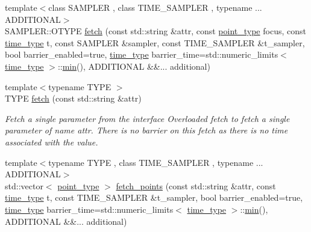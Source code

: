 \begin{DoxyCompactItemize}
{\footnotesize template$<$class S\+A\+M\+P\+L\+ER , class T\+I\+M\+E\+\_\+\+S\+A\+M\+P\+L\+ER , typename ... A\+D\+D\+I\+T\+I\+O\+N\+AL$>$ }\\S\+A\+M\+P\+L\+E\+R\+::\+O\+T\+Y\+PE \hyperlink{classmui_1_1uniface_acf7e84a01d20ef06dbcf4a1812456b24}{fetch} (const std\+::string \&attr, const \hyperlink{classmui_1_1uniface_abc356ab801269c69e38dc07179f85ef9}{point\+\_\+type} focus, const \hyperlink{classmui_1_1uniface_a65cbecf1936d7d61cb45f14b1138dc07}{time\+\_\+type} t, const S\+A\+M\+P\+L\+ER \&sampler, const T\+I\+M\+E\+\_\+\+S\+A\+M\+P\+L\+ER \&t\+\_\+sampler, bool barrier\+\_\+enabled=true, \hyperlink{classmui_1_1uniface_a65cbecf1936d7d61cb45f14b1138dc07}{time\+\_\+type} barrier\+\_\+time=std\+::numeric\+\_\+limits$<$ \hyperlink{classmui_1_1uniface_a65cbecf1936d7d61cb45f14b1138dc07}{time\+\_\+type} $>$\+::\hyperlink{namespacemui_afabb57f76b23f5a3542a0510943e69e0}{min}(), A\+D\+D\+I\+T\+I\+O\+N\+AL \&\&... additional)
\item 
{\footnotesize template$<$typename T\+Y\+PE $>$ }\\T\+Y\+PE \hyperlink{classmui_1_1uniface_a7f1cd967f1ed10c987c882f41474a54a}{fetch} (const std\+::string \&attr)
\begin{DoxyCompactList}\small\item\em Fetch a single parameter from the interface Overloaded {\ttfamily fetch} to fetch a single parameter of name {\ttfamily attr}. There is no barrier on this fetch as there is no time associated with the value. \end{DoxyCompactList}\item 
{\footnotesize template$<$typename T\+Y\+PE , class T\+I\+M\+E\+\_\+\+S\+A\+M\+P\+L\+ER , typename ... A\+D\+D\+I\+T\+I\+O\+N\+AL$>$ }\\std\+::vector$<$ \hyperlink{classmui_1_1uniface_abc356ab801269c69e38dc07179f85ef9}{point\+\_\+type} $>$ \hyperlink{classmui_1_1uniface_aa5fba70a831eece35bfc85e92fc080d1}{fetch\+\_\+points} (const std\+::string \&attr, const \hyperlink{classmui_1_1uniface_a65cbecf1936d7d61cb45f14b1138dc07}{time\+\_\+type} t, const T\+I\+M\+E\+\_\+\+S\+A\+M\+P\+L\+ER \&t\+\_\+sampler, bool barrier\+\_\+enabled=true, \hyperlink{classmui_1_1uniface_a65cbecf1936d7d61cb45f14b1138dc07}{time\+\_\+type} barrier\+\_\+time=std\+::numeric\+\_\+limits$<$ \hyperlink{classmui_1_1uniface_a65cbecf1936d7d61cb45f14b1138dc07}{time\+\_\+type} $>$\+::\hyperlink{namespacemui_afabb57f76b23f5a3542a0510943e69e0}{min}(), A\+D\+D\+I\+T\+I\+O\+N\+AL \&\&... additional)
\item 

\end{DoxyCompactItemize}
